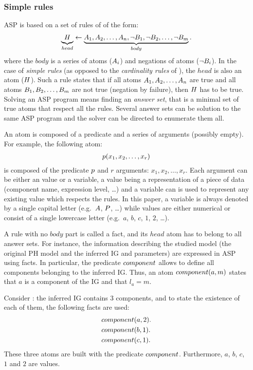 \subsubsection{Simple rules}\label{sssec:simple_rules}
ASP is based on a set of rules of of the form:
\begin{align*}
  \underbrace{{\ }H_{\ }}_{head} \leftarrow \underbrace{A_1, A_2, \dots, A_n, \neg B_1, \neg B_2, \dots, \neg B_m}_{body}.
\end{align*}
where the $body$ is a series of atoms ($A_i$) and negations of atoms ($\neg B_i$).
In the case of \emph{simple rules} (as opposed to the \emph{cardinality rules} of ), the $head$ is also an atom ($H$).
Such a rule states that if all atoms $A_1, A_2, \dots, A_n$ are true
and all atoms $B_1, B_2, \dots, B_m$ are not true (negation by failure), then $H$ has to be true.
Solving an ASP program means finding an \emph{answer set}, that is a minimal set of true atoms that respect all the rules.
Several answer sets can be solution to the same ASP program and the solver can be directed to enumerate them all.

An atom is composed of a predicate and a series of arguments (possibly empty).
For example, the following atom:
\begin{align*}
  p(x_1, x_2, \dots, x_r)
\end{align*}
is composed of the predicate $p$ and $r$ arguments: $x_1, x_2, \dots, x_r$.
Each argument can be either an value or a variable,
a value being a representation of a piece of data (component name, expression level, …)
and a variable can is used to represent any existing value which respects the rules.
In this paper, a variable is always denoted by a single capital letter (e.g.~$A$, $P$, …)
while values are either numerical or consist of a single lowercase letter (e.g.~$a$, $b$, $c$, $1$, $2$, …).

A rule with no $body$ part is called a fact, and its $head$ atom has to belong to all answer sets.
For instance, the information describing the studied model (the original PH model and the inferred IG and parameters) are expressed in ASP using facts.
In particular, the predicate $component$ allows to define all components belonging to the inferred IG.
Thus, an atom $component(a, m)$ states that $a$ is a component of the IG and that $l_a = m$.

\begin{example}
Consider : the inferred IG contains 3 components, and to state the existence of each of them, the following facts are used:
\begin{align*}
  &component(a, 2). \\
  &component(b, 1). \\
  &component(c, 1).
\end{align*}
These three atoms are built with the predicate $component$.
Furthermore, $a$, $b$, $c$, $1$ and $2$ are values.
\end{example}

